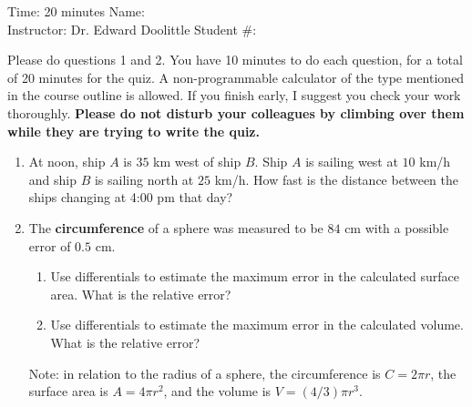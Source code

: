 \documentclass[12pt]{article}
\newcommand{\ds}{\displaystyle}
\begin{document}
\thispagestyle{plain}

\begin{flushleft}
Time:  20 minutes                \hfill       Name: \underline{\hspace{2in}} \\
Instructor: Dr. Edward Doolittle \hfill Student \#: \underline{\hspace{2in}}
\end{flushleft}

\noindent
Please do questions 1 and 2.  You have 10 minutes
to do each question, for a total of 20
minutes for the quiz.  A non-programmable
calculator of the type mentioned in the course outline is allowed.
If you finish early, I suggest you check your work thoroughly.
\textbf{Please do not disturb your colleagues by climbing over them while
they are trying to write the quiz.}

\begin{enumerate}
\item At 
  noon, ship $A$ is $35$ km west of ship $B$.  Ship $A$ is sailing
  west at $10$ km/h and ship $B$ is sailing north at $25$ km/h.  How fast
  is the distance between the ships changing at 4:00 pm that day?
\newpage
\item The
  \textbf{circumference} of a sphere was measured to be $84$ cm with
  a possible error of $0.5$ cm.
  \begin{enumerate}
  \item Use differentials to estimate the maximum error in the calculated
    surface area.  What is the relative error?
  \item Use differentials to estimate the maximum error in the calculated
    volume.  What is the relative error?
  \end{enumerate}
  Note: in relation to the radius of a sphere, 
  the circumference is $C=2\pi r$, the surface area is $A=4\pi r^2$, and
  the volume is $\ds V=(4/3) \pi r^3$.
\end{enumerate}
\end{document}
